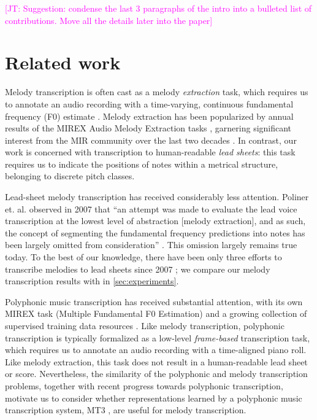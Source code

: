 \documentclass{article}
\newcommand\john[1]{\textcolor{magenta}{[JT: #1]}}
\begin{document}
\john{Suggestion: condense the last 3 paragraphs of the intro into a bulleted list of contributions. Move all the details later into the paper}

\section{Related work}

Melody transcription is often cast as a melody \emph{extraction} task, which requires us to annotate an audio recording with a time-varying, continuous fundamental frequency (F0) estimate \cite{goto2004real}. Melody extraction has been popularized by annual results of the MIREX Audio Melody Extraction tasks \cite{downie2014ten}, garnering significant interest from the MIR community over the last two decades \cite{salamon2014melody,rao2022melody}. In contrast, our work is concerned with transcription to human-readable \emph{lead sheets}: this task requires us to indicate the positions of notes within a metrical structure, belonging to discrete pitch classes.

Lead-sheet melody transcription has received considerably less attention. Poliner et. al. observed in 2007 that ``an attempt was made to evaluate the lead voice transcription at the lowest level of abstraction [melody extraction], and as such, the concept of segmenting the fundamental frequency predictions into notes has been largely omitted from consideration'' \cite{poliner2007melody}. This omission largely remains true today. To the best of our knowledge, there have been only three efforts to transcribe melodies to lead sheets since 2007 \cite{ryynanen2008automatic,weil2009automatic,laaksonen2014automaticO}; we compare our melody transcription results with \cite{ryynanen2008automatic} in \cref{sec:experiments}.

Polyphonic music transcription has received substantial attention, with its own MIREX task (Multiple Fundamental F0 Estimation) and a growing collection of supervised training data resources \cite{benetos2013automatic,thickstun2017learning,hawthorne2019enabling,manilow2019cutting}. Like melody transcription, polyphonic transcription is typically formalized as a low-level \emph{frame-based} transcription task, which requires us to annotate an audio recording with a time-aligned piano roll. Like melody extraction, this task does not result in a human-readable lead sheet or score. Nevertheless, the similarity of the polyphonic and melody transcription problems, together with recent progress towards polyphonic transcription, motivate us to consider whether representations learned by a polyphonic music transcription system, MT3 \cite{gardner2021mt3}, are useful for melody transcription.
\end{document}
